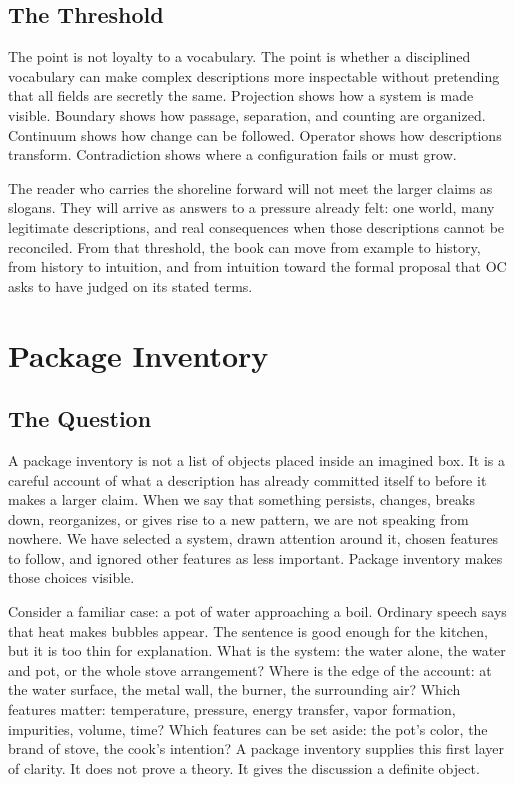\documentclass[11pt,a4paper,openany]{book}
\begin{document}
\subsection{The Threshold}
The point is not loyalty to a vocabulary. The point is whether a disciplined vocabulary can make complex descriptions more inspectable without pretending that all fields are secretly the same. Projection shows how a system is made visible. Boundary shows how passage, separation, and counting are organized. Continuum shows how change can be followed. Operator shows how descriptions transform. Contradiction shows where a configuration fails or must grow. \cite{grimmett_percolation,goldenfeld_lectures}\par
The reader who carries the shoreline forward will not meet the larger claims as slogans. They will arrive as answers to a pressure already felt: one world, many legitimate descriptions, and real consequences when those descriptions cannot be reconciled. From that threshold, the book can move from example to history, from history to intuition, and from intuition toward the formal proposal that OC asks to have judged on its stated terms.\par
\section{Package Inventory}
\subsection{The Question}
A package inventory is not a list of objects placed inside an imagined box. It is a careful account of what a description has already committed itself to before it makes a larger claim. When we say that something persists, changes, breaks down, reorganizes, or gives rise to a new pattern, we are not speaking from nowhere. We have selected a system, drawn attention around it, chosen features to follow, and ignored other features as less important. Package inventory makes those choices visible. \cite{goldenfeld_lectures,kadanoff_scaling}\par
Consider a familiar case: a pot of water approaching a boil. Ordinary speech says that heat makes bubbles appear. The sentence is good enough for the kitchen, but it is too thin for explanation. What is the system: the water alone, the water and pot, or the whole stove arrangement? Where is the edge of the account: at the water surface, the metal wall, the burner, the surrounding air? Which features matter: temperature, pressure, energy transfer, vapor formation, impurities, volume, time? Which features can be set aside: the pot's color, the brand of stove, the cook's intention? A package inventory supplies this first layer of clarity. It does not prove a theory. It gives the discussion a definite object.\par
\end{document}
